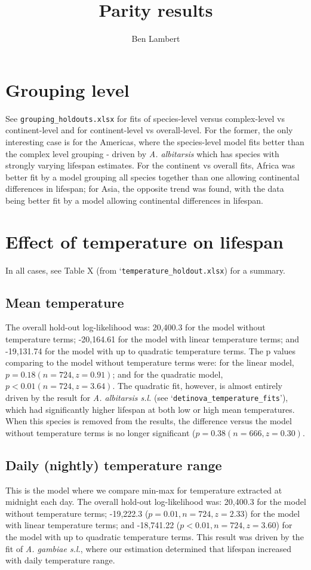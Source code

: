 \documentclass[]{article}
\title{Parity results}
\author{Ben Lambert}
\begin{document}
\maketitle

\section{Grouping level}
See \verb|grouping_holdouts.xlsx| for fits of species-level versus complex-level vs continent-level and for continent-level vs overall-level. For the former, the only interesting case is for the Americas, where the species-level model fits better than the complex level grouping - driven by \textit{A. albitarsis} which has species with strongly varying lifespan estimates. For the continent vs overall fits, Africa was better fit by a model grouping all species together than one allowing continental differences in lifespan; for Asia, the opposite trend was found, with the data being better fit by a model allowing continental differences in lifespan.


\section{Effect of temperature on lifespan}
In all cases, see Table X (from `\verb|temperature_holdout.xlsx|) for a summary.

\subsection{Mean temperature}
The overall hold-out log-likelihood was: 20,400.3 for the model without temperature terms; -20,164.61 for the model with linear temperature terms; and -19,131.74 for the model with up to quadratic temperature terms. The p values comparing to the model without temperature terms were: for the linear model, $p=0.18 (n=724, z=0.91)$; and for the quadratic model, $p<0.01 (n=724, z=3.64)$. The quadratic fit, however, is almost entirely driven by the result for \textit{A. albitarsis s.l.} (see `\verb|detinova_temperature_fits|'), which had significantly higher lifespan at both low or high mean temperatures. When this species is removed from the results, the difference versus the model without temperature terms is no longer significant ($p=0.38 (n=666, z=0.30)$.

\subsection{Daily (nightly) temperature range}
This is the model where we compare min-max for temperature extracted at midnight each day. The overall hold-out log-likelihood was: 20,400.3 for the model without temperature terms; -19,222.3 ($p=0.01, n=724, z=2.33$) for the model with linear temperature terms; and -18,741.22 ($p<0.01, n=724, z=3.60$) for the model with up to quadratic temperature terms. This result was driven by the fit of \textit{A. gambiae s.l.}, where our estimation determined that lifespan increased with daily temperature range.
\end{document}
